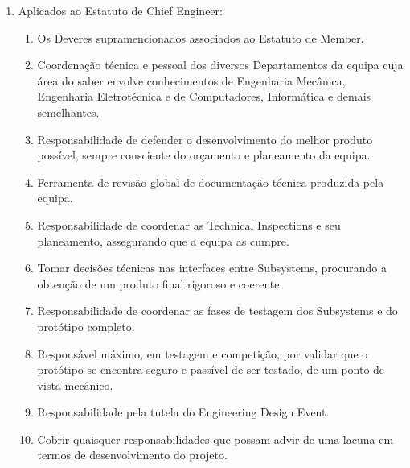 \begin{enumerate}
\begin{enumerate}
    \item Aplicados ao Estatuto de Chief Engineer:
    \begin{enumerate}
      \item Os Deveres supramencionados associados ao Estatuto de Member.
      \item Coordenação técnica e pessoal dos diversos Departamentos da equipa cuja área do saber envolve conhecimentos de Engenharia Mecânica, Engenharia Eletrotécnica e de Computadores, Informática e demais semelhantes.
      \item Responsabilidade de defender o desenvolvimento do melhor produto possível, sempre consciente do orçamento e planeamento da equipa.
      \item Ferramenta de revisão global de documentação técnica produzida pela equipa.
      \item Responsabilidade de coordenar as Technical Inspections e seu planeamento, assegurando que a equipa as cumpre.
      \item Tomar decisões técnicas nas interfaces entre Subsystems, procurando a obtenção de um produto final rigoroso e coerente.
      \item Responsabilidade de coordenar as fases de testagem dos Subsystems e do protótipo completo.
      \item Responsável máximo, em testagem e competição, por validar que o protótipo se encontra seguro e passível de ser testado, de um ponto de vista mecânico.
      \item Responsabilidade pela tutela do Engineering Design Event.
      \item Cobrir quaisquer responsabilidades que possam advir de uma lacuna em termos de desenvolvimento do projeto.
    \end{enumerate}


\end{enumerate}
\end{enumerate}
